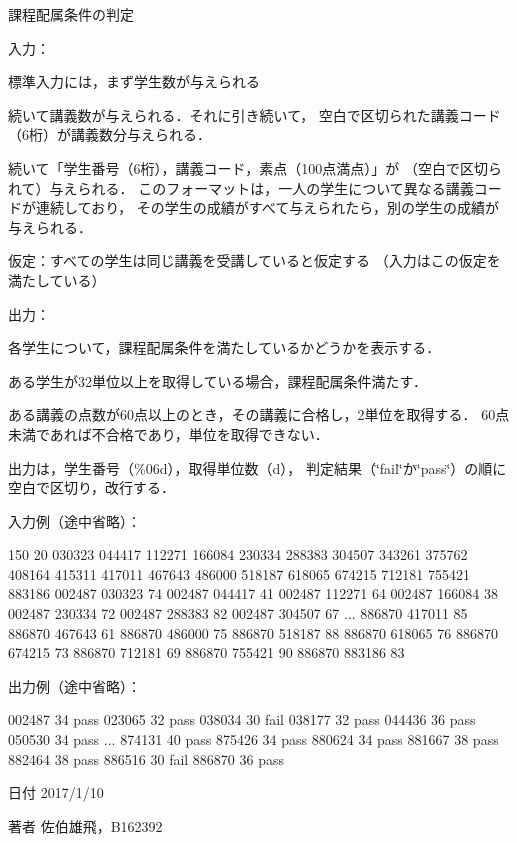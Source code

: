 課程配属条件の判定 

入力：
\begin{DoxyItemize}
\item 標準入力には，まず学生数が与えられる
\item 続いて講義数が与えられる．それに引き続いて， 空白で区切られた講義コード（6桁）が講義数分与えられる．
\item 続いて「学生番号（6桁），講義コード，素点（100点満点）」が （空白で区切られて）与えられる． このフォーマットは，一人の学生について異なる講義コードが連続しており， その学生の成績がすべて与えられたら，別の学生の成績が与えられる．
\item 仮定：すべての学生は同じ講義を受講していると仮定する （入力はこの仮定を満たしている）
\end{DoxyItemize}

出力：
\begin{DoxyItemize}
\item 各学生について，課程配属条件を満たしているかどうかを表示する．
\item ある学生が32単位以上を取得している場合，課程配属条件満たす．
\item ある講義の点数が60点以上のとき，その講義に合格し，2単位を取得する． 60点未満であれば不合格であり，単位を取得できない．
\item 出力は，学生番号（\%06d），取得単位数（d）， 判定結果（\char`\"{}fail\char`\"{}か\char`\"{}pass\char`\"{}）の順に空白で区切り，改行する．
\end{DoxyItemize}

入力例（途中省略）： \begin{DoxyVerb}150
20
030323 044417 112271 166084 230334 288383 304507 343261 375762 408164 415311
417011 467643 486000 518187 618065 674215 712181 755421 883186
002487 030323 74
002487 044417 41
002487 112271 64
002487 166084 38
002487 230334 72
002487 288383 82
002487 304507 67
...
886870 417011 85
886870 467643 61
886870 486000 75
886870 518187 88
886870 618065 76
886870 674215 73
886870 712181 69
886870 755421 90
886870 883186 83
\end{DoxyVerb}
 出力例（途中省略）： \begin{DoxyVerb}002487 34 pass
023065 32 pass
038034 30 fail
038177 32 pass
044436 36 pass
050530 34 pass
...
874131 40 pass
875426 34 pass
880624 34 pass
881667 38 pass
882464 38 pass
886516 30 fail
886870 36 pass
\end{DoxyVerb}
 \begin{DoxyDate}{日付}
2017/1/10 
\end{DoxyDate}
\begin{DoxyAuthor}{著者}
佐伯雄飛，\-B162392 
\end{DoxyAuthor}


